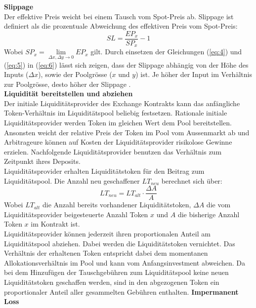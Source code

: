 \documentclass[12pt,a4paper,titlepage,oneside,english]{article}
\begin{document}
\textbf{Slippage}\\
Der effektive Preis weicht bei einem Tausch vom Spot-Preis ab.
Slippage ist definiert als die prozentuale Abweichung des effektiven Preis vom Spot-Preis: \citep{Martinelli2020}
\begin{equation}
SL = \dfrac{EP_{x}}{SP_{x}} - 1 \label{eq:6}
\end{equation}
Wobei $ SP_{x} = \lim\limits_{\Delta x, \Delta y \to 0} EP_{x} $ gilt. Durch einsetzen der Gleichungen (\ref{eq:4}) und (\ref{eq:5}) in (\ref{eq:6}) lässt sich zeigen, dass der Slippage abhängig von der Höhe des Inputs ($\Delta x$), sowie der Poolgrösse ($x$ und $y$) ist. Je höher der Input im Verhältnis zur Poolgrösse, desto höher der Slippage \citep{Berenzon2020}.\\


\textbf{Liquidität bereitstellen und abziehen}\\
Der initiale Liquiditätsprovider des Exchange Kontrakts kann das anfängliche Token-Verhältnis im Liquiditätspool beliebig festsetzen.  Rationale initiale Liquiditätsprovider werden Token im gleichen Wert dem Pool bereitstellen. Ansonsten weicht der relative Preis der Token im Pool vom Aussenmarkt ab und Arbitrageure können auf Kosten der Liquiditätsprovider risikolose Gewinne erzielen. Nachfolgende Liquiditätsprovider benutzen das Verhältnis zum Zeitpunkt ihres Deposits. \citep{Adams2020} \\ Liquiditätsprovider erhalten Liquiditätstoken für den Beitrag zum Liquiditätspool. Die Anzahl neu geschaffener $ LT_{neu}$ berechnet sich über: \citep{Adams2020} 
\begin{equation}
LT_{neu} = LT_{alt} \cdot \dfrac{\Delta A }{A} \label{eq:7}
\end{equation}
Wobei $LT_{alt}$ die Anzahl bereits vorhandener Liquiditätstoken, $\Delta A$ die vom Liquiditätsprovider beigesteuerte Anzahl Token $x$ und $A$ die bisherige Anzahl Token $x$ im Kontrakt ist.\\
Liquiditätsprovider können jederzeit ihren proportionalen Anteil am Liquiditätspool abziehen. Dabei werden die Liquiditätstoken \glqq vernichtet\grqq . Das Verhältnis der erhaltenen Token entspricht dabei dem momentanen Allokationsverhältnis im Pool und kann vom Anfangsinvestment abweichen. Da bei dem Hinzufügen der Tauschgebühren zum Liquiditätspool keine neuen Liquiditätstoken geschaffen werden, sind in den abgezogenen Token ein proportionaler Anteil aller gesammelten Gebühren enthalten. \citep{Adams2020} 
\newpage
\textbf{Impermanent Loss}\\
\end{document}
